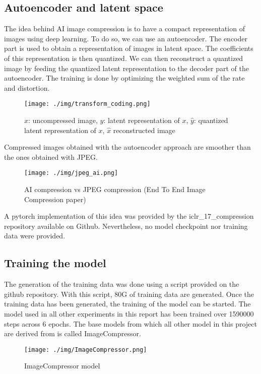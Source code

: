 \documentclass[12pt]{article}
\begin{document}
\subsection{Autoencoder and latent space}
The idea behind AI image compression is to have a compact representation of images using deep learning. To do so, we can use an autoencoder. The encoder part is used to obtain a representation of images in latent space. The coefficients of this representation is then quantized. We can then reconstruct a quantized image by feeding the quantized latent representation to the decoder part of the autoencoder. The training is done by optimizing the weighted sum of the rate and distortion.
\begin{figure}[H]
    \centering
    \texttt{[image: ./img/transform\_coding.png]}
    \caption[short]{$x$: uncompressed image, $y$: latent representation of $x$, $\hat{y}$: quantized latent representation of $x$, $\hat{x}$ reconstructed image}
\end{figure}
Compressed images obtained with the autoencoder approach are smoother than the ones obtained with JPEG.
\begin{figure}
    \centering
    \texttt{[image: ./img/jpeg\_ai.png]}
    \caption[short]{AI compression vs JPEG compression (End To End Image Compression paper)}
\end{figure}

A pytorch implementation of this idea was provided by the iclr\_17\_compression repository available on Github. Nevertheless, no model checkpoint nor training data were provided.


\subsection{Training the model}
The generation of the training data was done using a script provided on the github repository. With this script, 80G of training data are generated. Once the training data has been generated, the training of the model can be started. The model used in all other experiments in this report has been trained over 1590000 steps across 6 epochs. The base models from which all other model in this project are derived from is called ImageCompressor.
\begin{figure}[H]
    \centering
    \texttt{[image: ./img/ImageCompressor.png]}
    \caption[short]{ImageCompressor model}
\end{figure}
\end{document}
